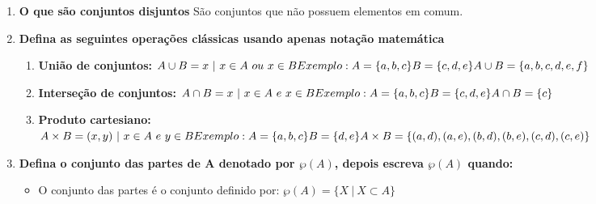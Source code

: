\documentclass{abntex2}
\begin{document}
  \begin{enumerate}
    \item \textbf{O que são conjuntos disjuntos} \newline
    São conjuntos que não possuem elementos em comum.
    \item \textbf{Defina as seguintes operações clássicas usando apenas notação matemática}
    \begin{enumerate}
      \item \textbf{União de conjuntos:}
      \begin{math}
        \\ A \cup B = x  \ | \ x \in A  \ ou \ x  \in B \\
        Exemplo: \\
        A = \{ a,b,c \} \\
        B = \{ c,d,e \} \\
        A \cup B = \{a,b,c,d,e,f\}
      \end{math}
      \item \textbf{Interseção de conjuntos:}
      \begin{math}
        \\ A \cap B = x \ | \ x \in A \ e \ x \in B \\
        Exemplo: \\
        A = \{ a,b,c \} \\
        B = \{ c,d,e \} \\
        A \cap B = \{c\}
      \end{math}
      \item \textbf{Produto cartesiano:}
      \begin{math}
        \\ A \times B =  (x,y) \ | \ x \in A \ e \ y \in B \\
        Exemplo: \\
        A = \{ a,b,c \} \\
        B = \{ d,e \} \\
        A \times B = \{ (a,d),(a,e),(b,d),(b,e),(c,d),(c,e)\}
      \end{math}
    \end{enumerate}
    \item \textbf{Defina o conjunto das partes de A denotado por $\wp(A)$, depois escreva  $ \wp(A) $ quando:}
    \begin{itemize}
      \item O conjunto das partes é o conjunto definido por:
      \begin{math}
        \wp(A) = \{ X \ | \ X \subset A \}

\end{math}
\end{itemize}
\end{enumerate}
\end{document}

